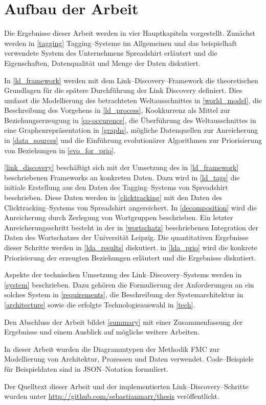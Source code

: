 \section{Aufbau der Arbeit}

Die Ergebnisse dieser Arbeit werden in vier Hauptkapiteln vorgestellt. Zunächst werden in \cref{tagging} Tagging--Systeme im Allgemeinen und das beispielhaft verwendete System des Unternehmens Spreadshirt erläutert und die Eigenschaften, Datenqualität und Menge der Daten diskutiert.

In \cref{ld_framework} werden mit dem Link--Discovery--Framework die theoretischen Grundlagen für die spätere Durchführung der Link Discovery definiert. Dies umfasst die Modellierung des betrachteten Weltausschnittes in \cref{world_model}, die Beschreibung des Vorgehens in \cref{ld_process}, Kookkurrenz als Mittel zur Beziehungserzeugung in \cref{co-occurence}, die Überführung des Weltausschnittes in eine Graphenrepräsentation in \cref{graphs}, mögliche Datenquellen zur Anreicherung in \cref{data_sources} und die Einführung evolutionärer Algorithmen zur Priorisierung von Beziehungen in \cref{evo_for_prio}.

\cref{link_discovery} beschäftigt sich mit der Umsetzung des in \cref{ld_framework} beschriebenen Frameworks an konkreten Daten. Dazu wird in \cref{ld_tags} die initiale Erstellung aus den Daten des Tagging--Systems von Spreadshirt beschrieben. Diese Daten werden in \cref{clicktracking} mit den Daten des Clicktracking--Systems von Spreadshirt angereichert. In \cref{decomposition} wird die Anreicherung durch Zerlegung von Wortgruppen beschrieben. Ein letzter Anreicherungsschritt besteht in der in \cref{wortschatz} beschriebenen Integration der Daten des Wortschatzes der Universität Leipzig. Die quantitativen Ergebnisse dieser Schritte werden in \cref{lda_results} diskutiert. in \cref{lda_prio} wird die konkrete Priorisierung der erzeugten Beziehungen erläutert und die Ergebnisse diskutiert.

Aspekte der technischen Umsetzung des Link--Discovery--Systems werden in \cref{system} beschrieben. Dazu gehören die Formulierung der Anforderungen an ein solches System in \cref{requirements}, die Beschreibung der Systemarchitektur in \cref{architecture} sowie die erfolgte Technologieauswahl in \cref{tech}.

Den Abschluss der Arbeit bildet \cref{summary} mit einer Zusammenfassung der Ergebnisse und einem Ausblick auf mögliche weitere Arbeiten.

In dieser Arbeit wurden die Diagrammtypen der Methodik FMC \cite{fmc} zur Modellierung von Architektur, Prozessen und Daten verwendet. Code--Beispiele für Beispieldaten sind in JSON--Notation \cite{json2006} formuliert.

Der Quelltext dieser Arbeit und der implementierten Link--Discovery--Schritte wurden unter \url{http://github.com/sebastianmarr/thesis} veröffentlicht.